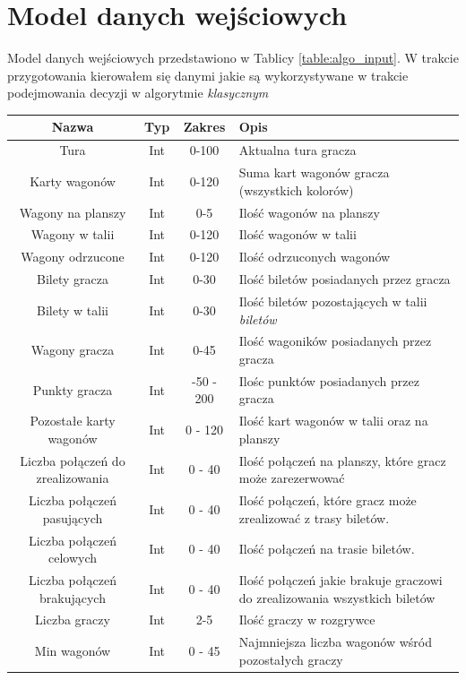 \documentclass[12pt, oneside]{report}
\begin{document}
	\section{Model danych wejściowych}
	Model danych wejściowych przedstawiono w Tablicy \ref{table:algo_input}. W trakcie przygotowania kierowałem się danymi jakie są wykorzystywane w trakcie podejmowania decyzji w algorytmie \textit{klasycznym}
	
	\begin{longtable}[h]{| c | c | c | p{6.5cm} |} \hline
		Nazwa & Typ & Zakres & Opis \\ \hline	
		Tura & Int & 0-100 & Aktualna tura gracza \\ \hline
		Karty wagonów & Int & 0-120 & Suma kart wagonów gracza (wszystkich kolorów) \\ \hline
		Wagony na planszy & Int & 0-5 & Ilość wagonów na planszy \\ \hline
		Wagony w talii & Int & 0-120 & Ilość wagonów w talii \\ \hline
		Wagony odrzucone & Int & 0-120 & Ilość odrzuconych wagonów \\ \hline
		Bilety gracza & Int & 0-30 & Ilość biletów posiadanych przez gracza \\ \hline
		Bilety w talii & Int & 0-30 & Ilość biletów pozostających w talii \textit{biletów} \\ \hline
		Wagony gracza & Int & 0-45 & Ilość wagoników posiadanych przez gracza \\ \hline
		Punkty gracza & Int & -50 - 200 & Ilośc punktów posiadanych przez gracza \\ \hline
		Pozostałe karty wagonów & Int & 0 - 120 & Ilość kart wagonów w talii oraz na planszy  \\ \hline
		Liczba połączeń do zrealizowania & Int & 0 - 40 & Ilość połączeń na planszy, które gracz może zarezerwować \\ \hline
		Liczba połączeń pasujących & Int & 0 - 40 & Ilość połączeń, które gracz może zrealizować z trasy biletów. \\ \hline
		Liczba połączeń celowych & Int & 0 - 40 & Ilość połączeń na trasie biletów. \\ \hline
		Liczba połączeń brakujących & Int & 0 - 40 & Ilość połączeń jakie brakuje graczowi do zrealizowania wszystkich biletów \\ \hline
		Liczba graczy & Int & 2-5 & Ilość graczy w rozgrywce \\ \hline
		Min wagonów  & Int & 0 - 45 & Najmniejsza liczba wagonów wśród pozostałych graczy \\ \hline

\end{longtable}
\end{document}
